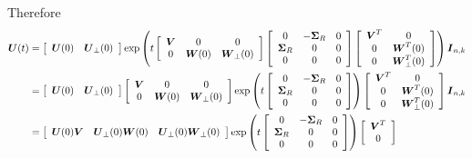 \documentclass[11pt]{article}
\begin{document}
\begin{enumerate}
Therefore
\begin{align*}
\boldsymbol{U}(t) &= \left[\begin{array}{cc}
\boldsymbol{U}(0) & \boldsymbol{U}_{\bot}(0)
\end{array}\right]\exp\left(t \left[\begin{array}{ccc}
\boldsymbol{V} & 0 & 0 \\ 
0 & \boldsymbol{W}(0) & \boldsymbol{W}_{\bot}(0)
\end{array} \right]  
\left[\begin{array}{ccc}
0 & -\boldsymbol{\Sigma}_{R} & 0 \\ 
\boldsymbol{\Sigma}_{R}& 0 & 0 \\ 
0 & 0 & 0
\end{array} \right]
\left[\begin{array}{cc}
\boldsymbol{V}^{T} &0\\
 0&  \boldsymbol{W}^{T}(0)\\ 
0 & \boldsymbol{W}_{\bot}^{T}(0)
\end{array} \right]\right)\boldsymbol{I}_{n,k}\\
&= \left[\begin{array}{cc}
\boldsymbol{U}(0) & \boldsymbol{U}_{\bot}(0)
\end{array}\right]\left[\begin{array}{ccc}
\boldsymbol{V} & 0 & 0 \\ 
0 & \boldsymbol{W}(0) & \boldsymbol{W}_{\bot}(0)
\end{array} \right]\exp\left(t \left[\begin{array}{ccc}
0 & -\boldsymbol{\Sigma}_{R} & 0 \\ 
\boldsymbol{\Sigma}_{R}& 0 & 0 \\ 
0 & 0 & 0
\end{array} \right]\right)\left[\begin{array}{cc}
\boldsymbol{V}^{T} &0\\
 0&  \boldsymbol{W}^{T}(0)\\ 
0 & \boldsymbol{W}_{\bot}^{T}(0)
\end{array} \right]  \boldsymbol{I}_{n,k}\\
&= \left[\begin{array}{ccc}
\boldsymbol{U}(0)\boldsymbol{V} & \boldsymbol{U}_{\bot}(0) \boldsymbol{W}(0) & \boldsymbol{U}_{\bot}(0) \boldsymbol{W}_{\bot}(0)
\end{array}\right]\exp\left(t \left[\begin{array}{ccc}
0 & -\boldsymbol{\Sigma}_{R} & 0 \\ 
\boldsymbol{\Sigma}_{R}& 0 & 0 \\ 
0 & 0 & 0
\end{array} \right]\right)\left[\begin{array}{c}
\boldsymbol{V}^{T} \\
 0\\ 

\end{array}\right]
\end{align*}
\end{enumerate}
\end{document}
